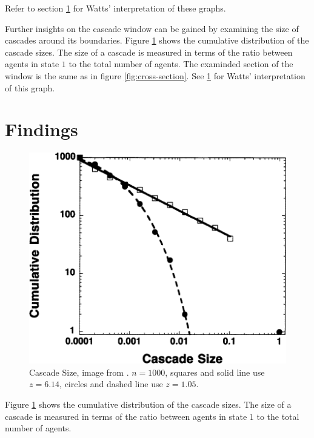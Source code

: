 \documentclass{sig-alternate-05-2015}
\begin{document}
Refer to section \ref{sec:findings} for Watts' interpretation of these graphs.

Further insights on the cascade window can be gained by examining the size of cascades around its boundaries. Figure \ref{fig:cascade-size} shows the cumulative distribution of the cascade sizes. The size of a cascade is measured in terms of the ratio between agents in state $1$ to the total number of agents. The examinded section of the window is the same as in figure \ref{fig:cross-section}. See \ref{sec:findings} for Watts' interpretation of this graph.


\section{Findings}\label{sec:findings}


\begin{figure}[h!]
  \centering
  \includegraphics[width=\columnwidth]{img/cascade-size}
  \caption{Cascade Size, image from \cite{simplemodel}. $n = 1000$, squares and solid line use $z = 6.14$, circles and dashed line use $z = 1.05$.}
  \label{fig:cascade-size}
\end{figure}

Figure \ref{fig:cascade-size} shows the cumulative distribution of the cascade sizes. The size of a cascade is measured in terms of the ratio between agents in state $1$ to the total number of agents.
\end{document}
